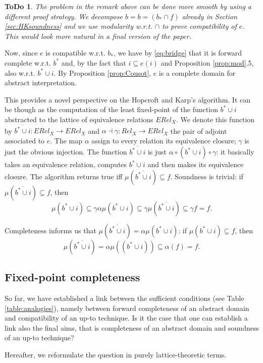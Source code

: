 \documentclass[smallcondensed,envcountsect,envcountsame]{svjour3}     %
\newtheorem{todo}[theorem]{\bf ToDo}
\begin{document}
\begin{todo}
The problem in the remark above can be done more smooth by using a different proof strategy. We decompose $b = b=(b_*\cap f)$ already in Section \ref{sec:HKsoundness} and we use modularity w.r.t. $\cap$ to prove compatibility of $e$. This would look more natural in a final version of the paper.
\end{todo}
Now, since $e$ is compatible w.r.t. $b_*$, we have by \eqref{eq:bridge} that it is forward complete w.r.t. $b^*$ and, by the fact that $i\subseteq e(i)$ and Proposition \ref{prop:mod}.5, also w.r.t. $b^*\cup i$. By Proposition \ref{prop:Cousot}, $e$ is a complete domain for abstract interpretation. 

This provides a novel perspective on the Hopcroft and Karp's algorithm. It can be though as the computation of the least fixed-point  of the function $b^*\cup i$ abstracted to the lattice of equivalence relations $ERel_X$. We denote this function by $\overline{b^*\cup i}\colon ERel_X \to ERel_X$ and $\alpha \dashv \gamma \colon Rel_X \to ERel_X$ the pair of adjoint associated to $e$. The map $\alpha$ assign to every relation its equivalence closure; $\gamma$ is just the obvious injection. The function $\overline{b^*\cup i}$ is just $\alpha \circ (b^*\cup i) \circ \gamma$: it basically takes an equivalence relation, computes $b^*\cup i$ and then makes its equivalence closure. The algorithm returns true iff $\mu (\overline{b^*\cup i}) \subseteq f$. Soundness is trivial: if $\mu (\overline{b^*\cup i})  \subseteq f$, then $$\mu (b^*\cup i) \subseteq \gamma \alpha \mu (b^*\cup i) \subseteq \gamma \mu (\overline{b^*\cup i}) \subseteq \gamma  f =f\text{.}$$

Completeness informs us that $\mu  (\overline{b^*\cup i}) = \alpha  \mu (b^*\cup i)$: if $\mu (b^*\cup i) \subseteq f$, then $$\mu (\overline{b^*\cup i})  = \alpha \mu ((b^*\cup i)) \subseteq \alpha(f) = f\text{.}$$

\subsection{Fixed-point completeness}
So far, we have established a link between the sufficient conditions (see Table \ref{table:analogies}), namely between forward completeness of an abstract domain and compatibility of an up-to technique. Is it the case that one can establish a link also the final aims, that is completeness of an abstract domain and soundness of an up-to technique?

Hereafter, we reformulate the question in purely lattice-theoretic terms.
\end{document}
